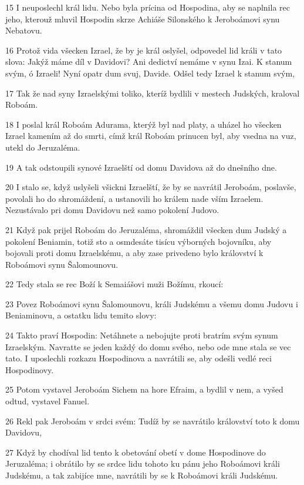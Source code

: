 \par 15 I neuposlechl král lidu. Nebo byla prícina od Hospodina, aby se naplnila rec jeho, kterouž mluvil Hospodin skrze Achiáše Silonského k Jeroboámovi synu Nebatovu.
\par 16 Protož vida všecken Izrael, že by je král oslyšel, odpovedel lid králi v tato slova: Jakýž máme díl v Davidovi? Ani dedictví nemáme v synu Izai. K stanum svým, ó Izraeli! Nyní opatr dum svuj, Davide. Odšel tedy Izrael k stanum svým,
\par 17 Tak že nad syny Izraelskými toliko, kteríž bydlili v mestech Judských, kraloval Roboám.
\par 18 I poslal král Roboám Adurama, kterýž byl nad platy, a uházel ho všecken Izrael kamením až do smrti, címž král Roboám prinucen byl, aby vsedna na vuz, utekl do Jeruzaléma.
\par 19 A tak odstoupili synové Izraelští od domu Davidova až do dnešního dne.
\par 20 I stalo se, když uslyšeli všickni Izraelští, že by se navrátil Jeroboám, poslavše, povolali ho do shromáždení, a ustanovili ho králem nade vším Izraelem. Nezustávalo pri domu Davidovu než samo pokolení Judovo.
\par 21 Když pak prijel Roboám do Jeruzaléma, shromáždil všecken dum Judský a pokolení Beniamin, totiž sto a osmdesáte tisícu výborných bojovníku, aby bojovali proti domu Izraelskému, a aby zase privedeno bylo království k Roboámovi synu Šalomounovu.
\par 22 Tedy stala se rec Boží k Semaiášovi muži Božímu, rkoucí:
\par 23 Povez Roboámovi synu Šalomounovu, králi Judskému a všemu domu Judovu i Beniaminovu, a ostatku lidu temito slovy:
\par 24 Takto praví Hospodin: Netáhnete a nebojujte proti bratrím svým synum Izraelským. Navratte se jeden každý do domu svého, nebo ode mne stala se vec tato. I uposlechli rozkazu Hospodinova a navrátili se, aby odešli vedlé reci Hospodinovy.
\par 25 Potom vystavel Jeroboám Sichem na hore Efraim, a bydlil v nem, a vyšed odtud, vystavel Fanuel.
\par 26 Rekl pak Jeroboám v srdci svém: Tudíž by se navrátilo království toto k domu Davidovu,
\par 27 Když by chodíval lid tento k obetování obetí v dome Hospodinove do Jeruzaléma; i obrátilo by se srdce lidu tohoto ku pánu jeho Roboámovi králi Judskému, a tak zabijíce mne, navrátili by se k Roboámovi králi Judskému.

